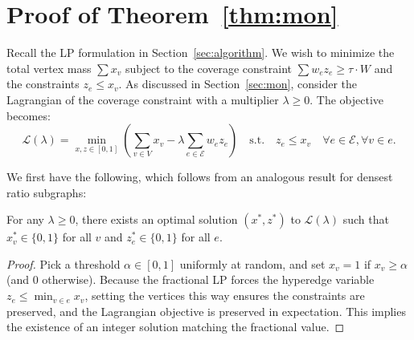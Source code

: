 \section{Proof of Theorem~\ref{thm:mon}}
\label{app:monotonicity}

Recall the  LP formulation  in Section~\ref{sec:algorithm}. We wish to minimize the total vertex mass $\sum x_v$ subject to the coverage constraint $\sum w_e z_e \ge \tau \cdot W$ and the constraints $z_e \le x_v$. As discussed in Section~\ref{sec:mon}, consider the Lagrangian of the coverage constraint with a multiplier $\lambda \ge 0$. The objective becomes:
\begin{equation}
    \label{eq:lagrangian_lp}
    \mathcal{L}(\lambda) = \min_{x, z \in [0,1]} \left( \sum_{v \in V} x_v - \lambda \sum_{e \in \mathcal{E}} w_e z_e \right) \quad \text{s.t.} \quad z_e \le x_v \quad \forall e \in \mathcal{E}, \forall v \in e.
\end{equation}

We first have the following, which follows from an analogous result for densest ratio subgraphs:

\begin{lemma}
\label{lem:integrality}
For any $\lambda \ge 0$, there exists an optimal solution $(x^*, z^*)$ to $\mathcal{L}(\lambda)$
such that $x^*_v \in \{0, 1\}$ for all $v$ and $z^*_e \in \{0, 1\}$ for all $e$.
\end{lemma}
\begin{proof}
    Pick a threshold $\alpha \in[0, 1]$ uniformly at random, and set $x_v = 1$ if $x_v \ge \alpha$ (and $0$ otherwise). Because the fractional LP forces the hyperedge variable $z_e \le \min_{v \in e} x_v$, setting the vertices this way ensures the constraints are preserved, and the Lagrangian objective is preserved in expectation. This implies the existence of an integer solution matching the fractional value.
\end{proof}







